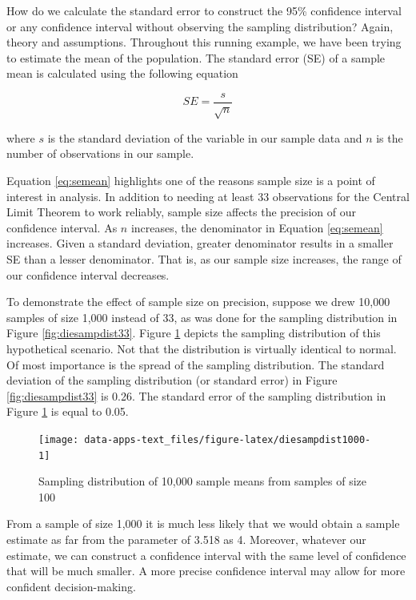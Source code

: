 \documentclass[
]{book}
\begin{document}
How do we calculate the standard error to construct the 95\% confidence interval or any confidence interval without observing the sampling distribution? Again, theory and assumptions. Throughout this running example, we have been trying to estimate the mean of the population. The standard error (SE) of a sample mean is calculated using the following equation

\begin{equation}
SE = \frac{s}{\sqrt{n}}
\label{eq:semean}
\end{equation}

where \(s\) is the standard deviation of the variable in our sample data and \(n\) is the number of observations in our sample.

Equation \eqref{eq:semean} highlights one of the reasons sample size is a point of interest in analysis. In addition to needing at least 33 observations for the Central Limit Theorem to work reliably, sample size affects the precision of our confidence interval. As \(n\) increases, the denominator in Equation \eqref{eq:semean} increases. Given a standard deviation, greater denominator results in a smaller SE than a lesser denominator. That is, as our sample size increases, the range of our confidence interval decreases.

To demonstrate the effect of sample size on precision, suppose we drew 10,000 samples of size 1,000 instead of 33, as was done for the sampling distribution in Figure \ref{fig:diesampdist33}. Figure \ref{fig:diesampdist1000} depicts the sampling distribution of this hypothetical scenario. Not that the distribution is virtually identical to normal. Of most importance is the spread of the sampling distribution. The standard deviation of the sampling distribution (or standard error) in Figure \ref{fig:diesampdist33} is 0.26. The standard error of the sampling distribution in Figure \ref{fig:diesampdist1000} is equal to 0.05.

\begin{figure}

{\centering \texttt{[image: data-apps-text\_files/figure-latex/diesampdist1000-1]} 

}

\caption{Sampling distribution of 10,000 sample means from samples of size 100}\label{fig:diesampdist1000}
\end{figure}

From a sample of size 1,000 it is much less likely that we would obtain a sample estimate as far from the parameter of 3.518 as 4. Moreover, whatever our estimate, we can construct a confidence interval with the same level of confidence that will be much smaller. A more precise confidence interval may allow for more confident decision-making.
\end{document}
